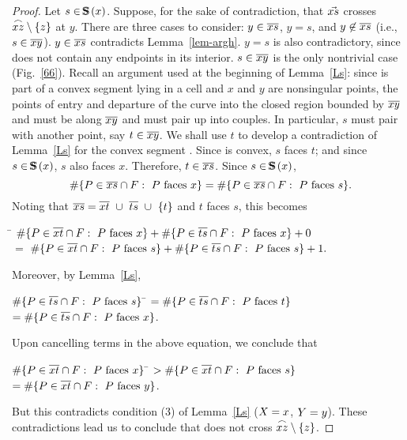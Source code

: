 \begin{proof}
Let $s \in \mbox{S\hspace{-0.68em}S\hspace{.25em}}(x)$.
Suppose, for the sake of contradiction, that $\mbox{$\vec{xs}$}$ crosses 
$\mbox{$\stackrel{\frown}{xz}$} \setminus \{z\}$ at $y$.
\label{thpr}
There are three cases to consider: $y \in \mbox{$\overline{xs}$}$, $y = s$, and 
$y \not\in \mbox{$\overline{xs}$}$
(i.e., $s \in \mbox{$\overline{xy}$}$).
$y \in \mbox{$\overline{xs}$}$ contradicts Lemma~\ref{lem-argh}.
$y = s$ is also contradictory, since  does not contain any 
endpoints in its 
interior.
$s \in \mbox{$\overline{xy}$}$ is the only nontrivial case (Fig.~\ref{66}).
Recall an argument used at the beginning of Lemma~\ref{Ls}:
since  is part of a convex segment lying in a cell
and $x$ and $y$ are nonsingular points,
the points of entry and departure of the curve into
the closed region bounded by $\mbox{$\overline{xy}$}$ and 
must be along $\mbox{$\overline{xy}$}$ and must pair up into couples.
In particular, $s$ must pair with another point, say $t \in \mbox{$\overline{xy}$}$.
We shall use $t$ to develop a contradiction of Lemma~\ref{Ls} for 
the convex 
segment .
Since  is convex, $s$ faces $t$; and since $s \in \mbox{S\hspace{-0.68em}S\hspace{.25em}}(x)$, $s$ 
also faces $x$. 
Therefore, $t \in \mbox{$\overline{xs}$}$.
Since \mbox{$s \in \mbox{S\hspace{-0.68em}S\hspace{.25em}}(x)$}, 
\[ \#\{P \in \mbox{$\overline{xs}$} \cap F: \mbox{ $P$ faces $x$}\}
= \#\{P \in \mbox{$\overline{xs}$} \cap F: \mbox{ $P$ faces $s$}\}. \]
Noting that $\seg{xs} = \seg{xt}\ \cup\ \seg{ts}\ \cup\ \{t\}$ and 
$t$ faces $s$, this becomes 
%
\vspace{.1in}
\begin{tabbing}
\hspace{.7in} \= $\#\{P \in \mbox{$\overline{xt}$} \cap F: \mbox{ $P$ faces $x$}\} +
\#\{P \in \mbox{$\overline{ts}$} \cap F: \mbox{ $P$ faces $x$}\} + 0$ \\
\nopagebreak
\hspace{.5in} $=$ \> $\#\{P \in \mbox{$\overline{xt}$} \cap F: \mbox{ $P$ faces $s$}\} +
\#\{P \in \mbox{$\overline{ts}$} \cap F: \mbox{ $P$ faces $s$}\} + 1.$
\end{tabbing}
\vspace{.1in}
%
Moreover, by Lemma~\ref{Ls},
%
\vspace{.05in}
\begin{tabbing}
\hspace{.7in} $\#\{P \in \mbox{$\overline{ts}$} \cap F: \mbox{ $P$ faces } s\}$ 
   \= $= \#\{P \in \mbox{$\overline{ts}$} \cap F: \mbox{ $P$ faces } t\}$ \\
\> $= \#\{P \in \mbox{$\overline{ts}$} \cap F: \mbox{ $P$ faces } x\}$.
\end{tabbing}
\vspace{.05in}
%
Upon cancelling terms in the above equation, we conclude that
%
\vspace{.05in}
\begin{tabbing}
\hspace{.7in} $\#\{P \in \mbox{$\overline{xt}$} \cap F: \mbox{ $P$ faces } x\}$ \=
   $> \#\{P \in \mbox{$\overline{xt}$} \cap F: \mbox{ $P$ faces } s\}$ \\
\> $= \#\{P \in \mbox{$\overline{xt}$} \cap F: \mbox{ $P$ faces } y\}$.
\end{tabbing}
\vspace{.05in}
%
But this contradicts condition (3) of Lemma~\ref{Ls} 
($X = x$, $Y = y$).
These contradictions lead us to conclude that  does not cross 
$\mbox{$\stackrel{\frown}{xz}$} \setminus \{z\}$.
\end{proof}

